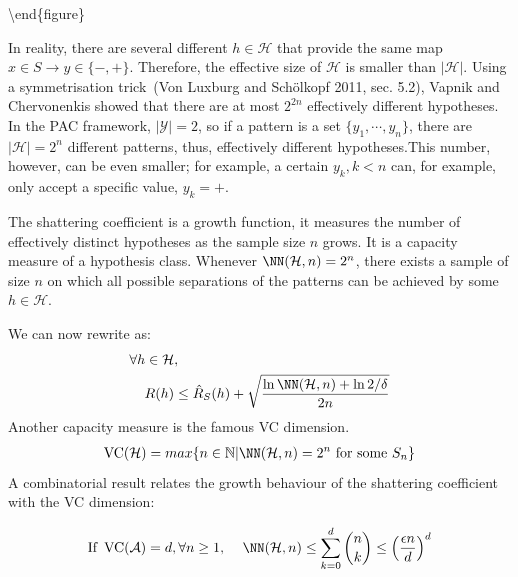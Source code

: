 \documentclass[
  letterpaper,
  12pt,
  british]{tufte-book}
\theoremstyle{plain}
\theoremstyle{definition}
\theoremstyle{plain}
\theoremstyle{remark}
\begin{document}
\textbackslash end\{figure\}

In reality, there are several different \(h \in \mathcal{H}\) that
provide the same map \(x \in S \to y \in \{-, +\}\). Therefore, the
effective size of \(\mathcal{H}\) is smaller than \(|\mathcal{H}|\).
Using a symmetrisation trick~(Von Luxburg and Schölkopf 2011, sec.
5.2),
Vapnik and Chervonenkis showed that there are at most \(2^{2n}\)
effectively different hypotheses. In the PAC framework,
\(|\mathcal{Y}|=2\), so if a pattern is a set \(\{y_1,\cdots,y_n\}\),
there are \(|\mathcal{H}|=2^n\) different patterns, thus, effectively
different hypotheses.This number, however, can be even smaller; for
example, a certain \(y_k, k<n\) can, for example, only accept a specific
value, \(y_k={+}\).

The shattering coefficient is a growth function, it measures the number
of effectively distinct hypotheses as the sample size \(n\) grows. It is
a capacity measure of a hypothesis class. Whenever
\(\NN(\mathcal{H}, n)=2^n\), there exists a sample of size \(n\) on
which all possible separations of the patterns can be achieved by some
\(h \in \mathcal{H}\).

We can now rewrite as: \begin{align}
    \forall h \in \mathcal{H}&,\nonumber\\
    R(h)&\leq \hat{R}_{S}(h) + \sqrt{\frac{\ln{\NN(\mathcal{H}, n)}+ \ln{2/\delta}}{2n}}
\end{align} Another capacity measure is the famous VC
dimension. \begin{align}
    \operatorname{VC}(\mathcal{H})=max\{n \in \mathbb{N}| \NN(\mathcal{H}, n)=2^n \text{ for some }S_n\}
\end{align} A combinatorial result relates the growth behaviour of the
shattering coefficient with the VC dimension:

\begin{align}
        \text{If }&\operatorname{VC}(\mathcal{A})=d, \forall n \geq 1,\nonumber
         ~&\NN(\mathcal{H}, n) \leq \sum_{k=0}^d \binom{n}{k} \leq\left(\frac{\epsilon n}{d}\right)^d
    
\end{align}
\end{document}
